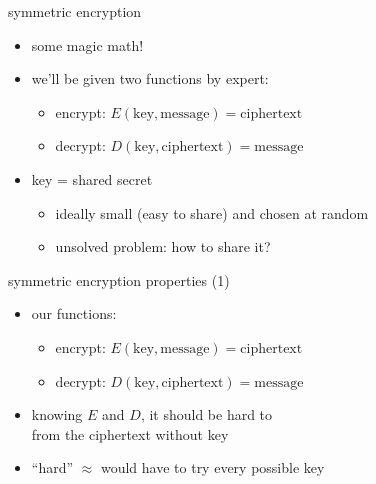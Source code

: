 \begin{frame}{symmetric encryption}
    \begin{itemize}
    \item some magic math!
    \vspace{.5cm}
    \item we'll be given two functions by expert:
        \begin{itemize}
        \item encrypt: $E(\text{key}, \text{message}) = \text{ciphertext}$
        \item decrypt: $D(\text{key}, \text{ciphertext}) = \text{message}$
        \end{itemize}
    \item key = shared secret
        \begin{itemize}
        \item ideally small (easy to share) and chosen at random
        \item unsolved problem: how to share it?
        \end{itemize}
    \end{itemize}
\end{frame}

\begin{frame}{symmetric encryption properties (1)}
    \begin{itemize}
    \item our functions:
        \begin{itemize}
        \item encrypt: $E(\text{key}, \text{message}) = \text{ciphertext}$
        \item decrypt: $D(\text{key}, \text{ciphertext}) = \text{message}$
        \end{itemize}
    \item knowing $E$ and $D$, it should be hard to \\
          from the ciphertext without key
    \item ``hard'' $\approx$ would have to try every possible key
    \end{itemize}
\end{frame}


